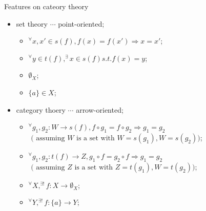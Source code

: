 \documentclass[dvipdfmx,10pt,notheorems]{beamer}
\renewcommand{\#}{^\sharp}
\begin{document}
	\begin{frame}{Features on cateory theory}
			\begin{itemize}
					\item set theory $\cdots$ point-oriented;
							\begin{itemize}
									\item $^\forall x,x'\in s(f), f(x)=f(x')\Rightarrow x=x'$;
									\item $^\forall y\in t(f), ^\exists x\in s(f) s.t. f(x)=y$;
									\item $\emptyset_X$;
								\item $\{a\}\in X$;
							\end{itemize}
					\item category thoery $\cdots$ arrow-oriented;
							\begin{itemize}
									\item $^\forall g_1, g_2: W\rightarrow s(f), f\circ g_1=f\circ g_2 \Rightarrow
									g_1=g_2$ $ \mbox{ ( assuming }W\mbox{ is a set with }W=s(g_1), W=s(g_2))$;
									\item $^\forall g_1, g_2: t(f)\rightarrow Z,  g_1 \circ f = g_2 \circ f \Rightarrow
									g_1=g_2$ $\mbox{ ( assuming }Z\mbox{ is a set with }Z=t(g_1), W=t(g_2))$;
									\item $^\forall X, ^{\exists !} f:X \rightarrow \emptyset_X$;
									\item $^\forall Y, ^{\exists !} f:\{a\}\rightarrow Y$;
							\end{itemize}
			\end{itemize}
	\end{frame}
	
	
	
\end{document}

